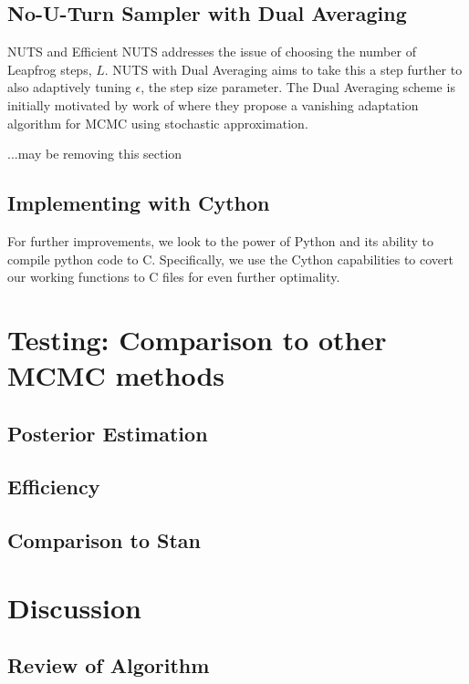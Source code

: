 \documentclass[12pt]{article}
\begin{document}
\subsection{No-U-Turn Sampler with Dual Averaging}
NUTS and Efficient NUTS addresses the issue of choosing the number of Leapfrog steps, $L$. NUTS with Dual Averaging aims to take this a step further to also adaptively tuning $\epsilon$, the step size parameter. The Dual Averaging scheme is initially motivated by work of \cite{robbins} where they propose a vanishing adaptation algorithm for MCMC using stochastic approximation. 

...may be removing this section

\subsection{Implementing with Cython}
For further improvements, we look to the power of Python and its ability to compile python code to C. Specifically, we use the Cython capabilities to covert our working functions to C files for even further optimality. 

\section{Testing: Comparison to other MCMC methods}
\subsection{Posterior Estimation} 
\subsection{Efficiency}
\subsection{Comparison to Stan}

\section{Discussion}
\subsection{Review of Algorithm}

\newpage

\end{document}
